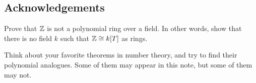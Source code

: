 \subsection*{Acknowledgements}


\begin{exercise}
    Prove that $\mathbb{Z}$ is not a polynomial ring over a field. In other words, show that there is no field $k$ such that $\mathbb{Z} \cong k[T]$ as rings.
\end{exercise}

\begin{exercise}
    Think about your favorite theorems in number theory, and try to find their polynomial analogues. Some of them may appear in this note, but some of them may not.
\end{exercise}


\newpage